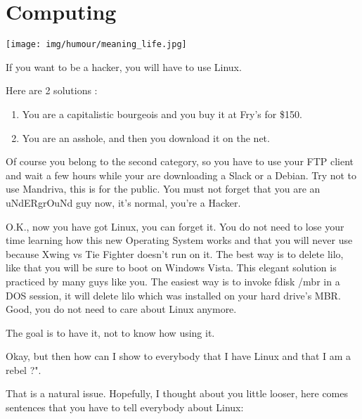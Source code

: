 	\pagebreak
	\section{Computing}

	\begin{center}
	\texttt{[image: img/humour/meaning\_life.jpg]}
	\end{center}
\begin{center}\underline{\hspace{5 cm}}\end{center}	

If you want to be a hacker, you will have to use Linux.

Here are 2 solutions :
\begin{enumerate}
	\item You are a capitalistic bourgeois and you buy it at Fry's for \$150.
	\item You are an asshole, and then you download it on the net.
\end{enumerate}

Of course you belong to the second category, so you have to use your FTP client and wait a few hours while your are downloading a Slack or a Debian. Try not to use Mandriva, this is for the public. You must not forget that you are an uNdERgrOuNd guy now, it's normal, you're a Hacker.

O.K., now you have got Linux, you can forget it. You do not need to lose your time learning how this new Operating System works and that you will never use because Xwing vs Tie Fighter doesn't run on it. The best way is to delete lilo, like that you will be sure to boot on Windows Vista. This elegant solution is practiced by many guys like you. The easiest way is to invoke fdisk /mbr in a DOS session, it will delete lilo which was installed on your hard drive's MBR. Good, you do not need to care about Linux anymore.

The goal is to have it, not to know how using it.

Okay, but then how can I show to everybody that I have Linux and that I am a rebel ?". 

That is a natural issue. Hopefully, I thought about you little looser, here comes sentences that you have to tell everybody about Linux:

